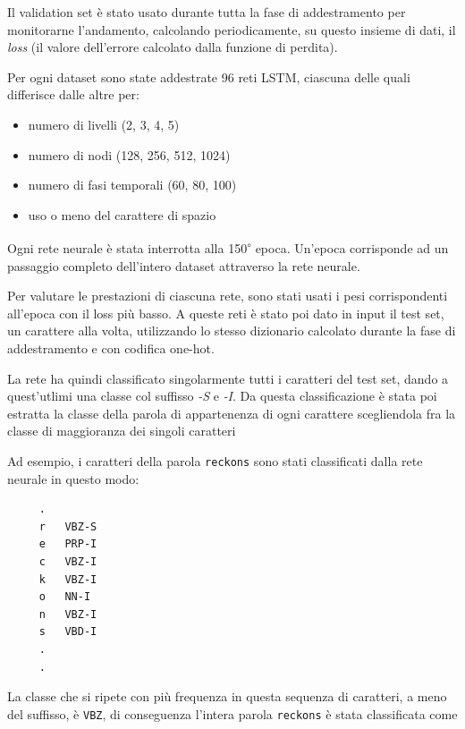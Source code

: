 Il validation set \`e stato usato durante tutta la fase di addestramento per monitorarne l'andamento, calcolando periodicamente, su questo insieme di dati, il \emph{loss} (il valore dell'errore calcolato dalla funzione di perdita).

Per ogni dataset sono state addestrate 96 reti LSTM, ciascuna delle quali differisce dalle altre per:

\begin{itemize}
  \item numero di livelli (2, 3, 4, 5)
  \item numero di nodi (128, 256, 512, 1024)
  \item numero di fasi temporali (60, 80, 100)
  \item uso o meno del carattere di spazio
\end{itemize}

Ogni rete neurale \`e stata interrotta alla 150\textsuperscript{$\circ$} epoca.
Un'epoca corrisponde ad un passaggio completo dell'intero dataset attraverso la rete neurale.

Per valutare le prestazioni di ciascuna rete, sono stati usati i pesi corrispondenti all'epoca con il loss pi\`u basso.
A queste reti \`e stato poi dato in input il test set, un carattere alla volta, utilizzando lo stesso dizionario calcolato durante la fase di addestramento e con codifica one-hot.

La rete ha quindi classificato singolarmente tutti i caratteri del test set, dando a quest'utlimi una classe col suffisso \emph{-S} e \emph{-I}.
Da questa classificazione \`e stata poi estratta la classe della parola di appartenenza di ogni carattere scegliendola fra la classe di maggioranza dei singoli caratteri

Ad esempio, i caratteri della parola \texttt{reckons} sono stati classificati dalla rete neurale in questo modo:

\begin{center}
  \begin{minipage}{5cm}
    \begin{verbatim}
     .
     r   VBZ-S
     e   PRP-I
     c   VBZ-I
     k   VBZ-I
     o   NN-I
     n   VBZ-I
     s   VBD-I
     .
     .
    \end{verbatim}
  \end{minipage}
\end{center}

La classe che si ripete con pi\`u frequenza in questa sequenza di caratteri, a meno del suffisso, \`e \texttt{VBZ}, di conseguenza l'intera parola \texttt{reckons} \`e stata classificata come

